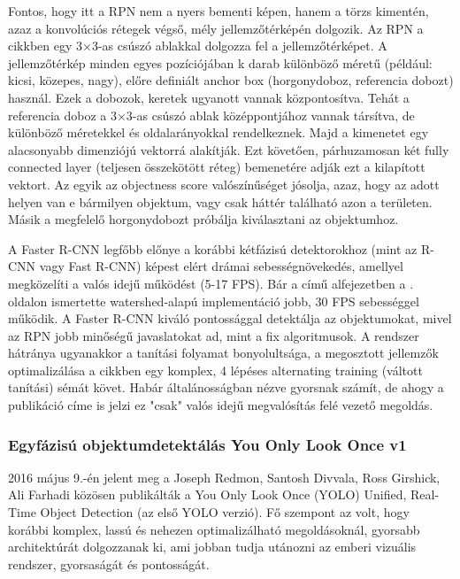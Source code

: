 Fontos, hogy itt a RPN nem a nyers bementi képen, hanem a törzs
kimentén, azaz a konvolúciós rétegek végső, mély jellemzőtérképén
dolgozik. Az RPN a cikkben egy 3×3-as csúszó ablakkal dolgozza fel a
jellemzőtérképet. A jellemzőtérkép minden egyes pozíciójában k darab
különböző méretű (például: kicsi, közepes, nagy), előre definiált anchor
box (horgonydoboz, referencia dobozt) használ. Ezek a dobozok, keretek
ugyanott vannak központosítva. Tehát a referencia doboz a 3×3-as csúszó
ablak középpontjához vannak társítva, de különböző méretekkel és
oldalarányokkal rendelkeznek. Majd a kimenetet egy alacsonyabb
dimenziójú vektorrá alakítják. Ezt követően, párhuzamosan két fully
connected layer (teljesen összekötött réteg) bemenetére adják ezt a
kilapított vektort. Az egyik az objectness score valószínűséget jósolja,
azaz, hogy az adott helyen van e bármilyen objektum, vagy csak háttér
található azon a területen. Másik a megfelelő horgonydobozt próbálja
kiválasztani az objektumhoz.

A Faster R-CNN legfőbb előnye a korábbi kétfázisú detektorokhoz (mint az
R-CNN vagy Fast R-CNN) képest elért drámai sebességnövekedés, amellyel
megközelíti a valós idejű működést (5-17 FPS). Bár a
 című alfejezetben a
\pageref{watershed-alapu}. oldalon 
ismertette watershed-alapú implementáció jobb, 30 FPS
sebességgel működik. A Faster R-CNN kiváló pontossággal detektálja az
objektumokat, mivel az RPN jobb minőségű javaslatokat ad, mint a fix
algoritmusok. A rendszer hátránya ugyanakkor a tanítási folyamat
bonyolultsága, a megosztott jellemzők optimalizálása a cikkben egy
komplex, 4 lépéses alternating training (váltott tanítási) sémát követ.
Habár általánosságban nézve gyorsnak számít, de ahogy a publikáció címe
is jelzi ez "csak" valós idejű megvalósítás felé vezető
megoldás. \cite{renFasterRCNNRealTime2017}

\subsubsection{Egyfázisú objektumdetektálás You Only Look Once v1}

2016 május 9.-én jelent meg a Joseph Redmon, Santosh Divvala, Ross
Girshick, Ali Farhadi közösen publikálták a You Only Look Once (YOLO)
Unified, Real-Time Object Detection (az első YOLO verzió). Fő szempont
az volt, hogy korábbi komplex, lassú és nehezen optimalizálható
megoldásoknál, gyorsabb architektúrát dolgozzanak ki, ami jobban tudja
utánozni az emberi vizuális rendszer, gyorsaságát és pontosságát.

